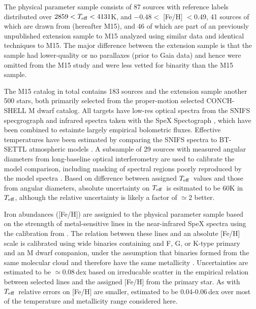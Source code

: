 \documentclass[modern]{aastex62}
\newcommand{\teff}{$T_{\rm eff}$}
\begin{document}
The physical parameter sample consists of 87 sources with reference labels distributed over $2859 <T_{\rm eff} < 4131$K, and $-0.48 <$ [Fe/H] $< 0.49$, 41 sources of which are drawn from \citealt{Mann:2015} (hereafter M15), and 46 of which are part of an previously unpublished extension sample to M15 analyzed using similar data and identical techniques to M15. The major difference between the extension sample is that the sample had lower-quality or no parallaxes (prior to Gaia data) and hence were omitted from the M15 study and were less vetted for binarity than the M15 sample.

The M15 catalog in total contains 183 sources and the extension sample another 500 stars, both primarily selected from the proper-motion selected CONCH-SHELL \citep{Gaidos:2013} M dwarf catalog. All targets have low-res optical spectra from the SNIFS specgrograph \citep{Lantz:2004} and infrared spectra taken with the SpeX Spectograph \citep{Rayner:2003}, which have been combined to estaimte largely empirical bolometric fluxes. Effective temperatures have been estimated by comparing the SNIFS spectra to BT-SETTL atmospheric models \citep{Allard:2011}. A subsample of 29 sources with measured angular diameters from long-baseline optical interferometry \citep{Boyajian:2012} are used to calibrate the model comparison, including masking of spectral regions poorly reproduced by the model spectra \citep{Mann:2013c}. Based on difference between assigned \teff\ values and those from angular diameters, absolute uncertainty on \teff\ is esitmated to be 60K in \teff, although the relative uncertainty is likely a factor of $\simeq$2 better.

Iron abundances ([Fe/H]) are assignied to the physical parameter sample based on the strenngth of metal-sensitive lines in the near-infrared SpeX spectra \citep{RojasAyala:2010} using the calibration from \citet{Mann:2013a}. The relation between these lines and an absolute [Fe/H] scale is calibrated using wide binaries containing and F, G, or K-type primary and an M dwarf companion, under the assumption that binaries formed from the same molecular cloud and therefore have the same metallicity \citep{Bonfils:2005}. Uncertainties are estimated to be $\simeq$0.08\,dex based on irreducable scatter in the empirical relation between selected lines and the assigned [Fe/H] from the primary star. As with \teff\ relative errors on [Fe/H] are smaller, estimated to be 0.04-0.06\,dex over most of the temperature and metallicity range considered here.
\end{document}
